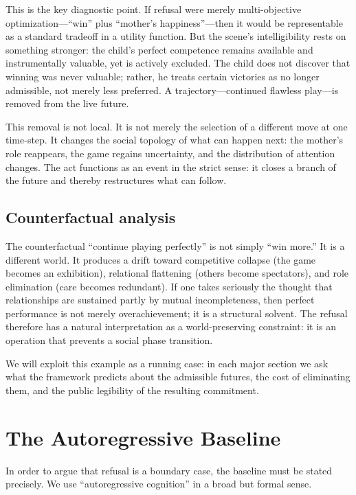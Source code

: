 \documentclass[11pt]{article}
\begin{document}
This is the key diagnostic point. If refusal were merely multi-objective
optimization---``win'' plus ``mother's happiness''---then it would be
representable as a standard tradeoff in a utility function. But the scene's
intelligibility rests on something stronger: the child's perfect competence
remains available and instrumentally valuable, yet is actively excluded. The
child does not discover that winning was never valuable; rather, he treats
certain victories as no longer admissible, not merely less preferred. A
trajectory---continued flawless play---is removed from the live future.

This removal is not local. It is not merely the selection of a different move at
one time-step. It changes the social topology of what can happen next: the
mother's role reappears, the game regains uncertainty, and the distribution of
attention changes. The act functions as an event in the strict sense: it closes
a branch of the future and thereby restructures what can follow.

\subsection{Counterfactual analysis}

The counterfactual ``continue playing perfectly'' is not simply ``win more.'' It
is a different world. It produces a drift toward competitive collapse (the game
becomes an exhibition), relational flattening (others become spectators), and
role elimination (care becomes redundant). If one takes seriously the thought
that relationships are sustained partly by mutual incompleteness, then perfect
performance is not merely overachievement; it is a structural solvent. The
refusal therefore has a natural interpretation as a world-preserving constraint:
it is an operation that prevents a social phase transition.

We will exploit this example as a running case: in each major section we ask
what the framework predicts about the admissible futures, the cost of eliminating
them, and the public legibility of the resulting commitment.

\section{The Autoregressive Baseline}
\label{sec:ar}

In order to argue that refusal is a boundary case, the baseline must be stated
precisely. We use ``autoregressive cognition'' in a broad but formal sense.
\end{document}
